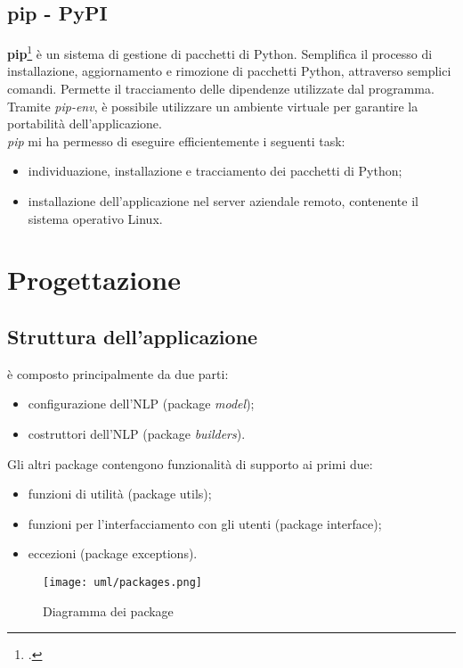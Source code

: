 \subsection{pip - PyPI}
\textbf{pip}\footcite{site:pypi} è un sistema di gestione di pacchetti di Python. Semplifica il processo di installazione, aggiornamento e rimozione di pacchetti Python, attraverso semplici comandi. Permette il tracciamento delle dipendenze utilizzate dal programma. Tramite \textit{pip-env}, è possibile utilizzare un ambiente virtuale per garantire la portabilità dell'applicazione.\\
\textit{pip} mi ha permesso di eseguire efficientemente i seguenti task:
\begin{itemize}
    \item individuazione, installazione e tracciamento dei pacchetti di Python;
    \item installazione dell'applicazione nel server aziendale remoto, contenente il sistema operativo Linux.
\end{itemize}

\section{Progettazione}
\label{sec:progettazione}
\subsection{Struttura dell'applicazione}
\app{} è composto principalmente da due parti:
\begin{itemize}
    \item configurazione dell'NLP (package \textit{model});
    \item costruttori dell'NLP (package \textit{builders}).
\end{itemize}
Gli altri package contengono funzionalità di supporto ai primi due:
\begin{itemize}
    \item funzioni di utilità (package utils);
    \item funzioni per l'interfacciamento con gli utenti (package interface);
    \item eccezioni (package exceptions).
\end{itemize}

\begin{figure}[H]
    \centering
    \texttt{[image: uml/packages.png]} 
    \caption{Diagramma dei package}
    \label{logo:pkg}
\end{figure}


